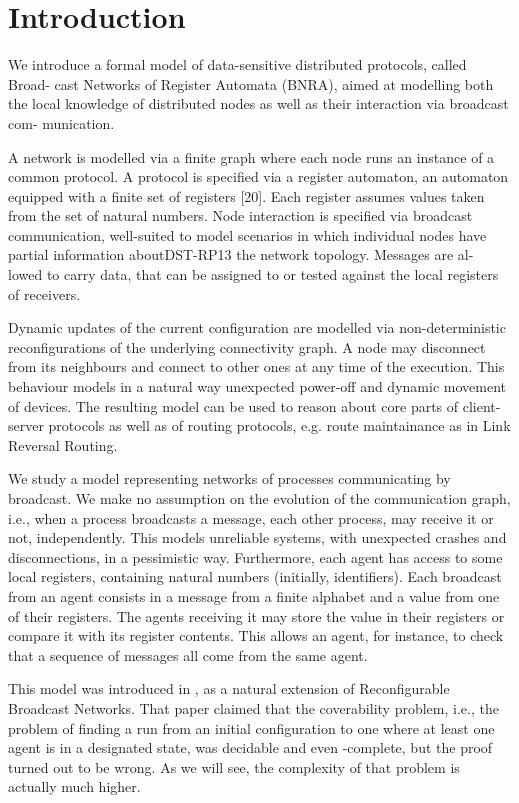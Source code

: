 \section{Introduction}

We introduce a formal model of data-sensitive distributed protocols, called Broad-
cast Networks of Register Automata (BNRA), aimed at modelling both the local
knowledge of distributed nodes as well as their interaction via broadcast com-
munication. 


A network is modelled via a finite graph where each node runs an
instance of a common protocol. A protocol is specified via a register automaton,
an automaton equipped with a finite set of registers [20]. Each register assumes
values taken from the set of natural numbers. Node interaction is specified via
broadcast communication, well-suited to model scenarios in which individual
nodes have partial information aboutDST-RP13 the network topology. Messages are al-
lowed to carry data, that can be assigned to or tested against the local registers
of receivers. 

Dynamic updates of the current configuration are modelled via
non-deterministic reconfigurations of the underlying connectivity graph. A node
may disconnect from its neighbours and connect to other ones at any time of the
execution. This behaviour models in a natural way unexpected power-off and
dynamic movement of devices. The resulting model can be used to reason about
core parts of client-server protocols as well as of routing protocols, e.g. route
maintainance as in Link Reversal Routing.

We study a model representing networks of processes communicating by broadcast. We make no assumption on the evolution of the communication graph, i.e., when a process broadcasts a message, each other process, may receive it or not, independently. This models unreliable systems, with unexpected crashes and disconnections, in a pessimistic way. 
Furthermore, each agent has access to some local registers, containing natural numbers (initially, identifiers). Each broadcast from an agent consists in a message from a finite alphabet and a value from one of their registers. The agents receiving it may store the value in their registers or compare it with its register contents. 
This allows an agent, for instance, to check that a sequence of messages all come from the same agent.


This model was introduced in \cite{DST2013}, as a natural extension of Reconfigurable Broadcast Networks. That paper claimed that the coverability problem, i.e., the problem of finding a run from an initial configuration to one where at least one agent is in a designated state, was decidable and even \PSPACE-complete, but the proof turned out to be wrong. As we will see, the complexity of that problem is actually much higher.

